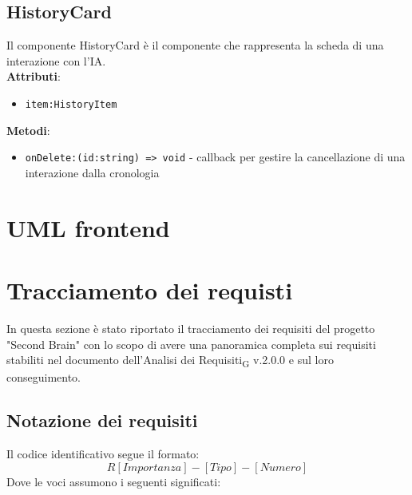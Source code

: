 \documentclass[11pt,a4paper]{article}
\newcommand{\gls}[1]{#1\textsubscript{G}}
\begin{document}
\subsection{HistoryCard}
Il componente HistoryCard è il componente che rappresenta la scheda di una interazione con l'IA.\\

\textbf{Attributi}:
\begin{itemize}
    \item \texttt{item:HistoryItem}
\end{itemize}

\textbf{Metodi}:
\begin{itemize}
    \item \texttt{onDelete:(id:string) => void} - callback per gestire la cancellazione di una interazione dalla cronologia
\end{itemize}

\section{UML frontend}

\section{Tracciamento dei requisti}
In questa sezione è stato riportato il tracciamento dei requisiti del progetto "Second Brain" con lo scopo di avere una panoramica completa sui requisiti stabiliti nel documento dell'\gls{Analisi dei Requisiti} v.2.0.0 e sul loro conseguimento.

\subsection{Notazione dei requisiti}
Il codice identificativo segue il formato:
\[
R[Importanza]-[Tipo]-[Numero]
\]
Dove le voci assumono i seguenti significati:
\end{document}
